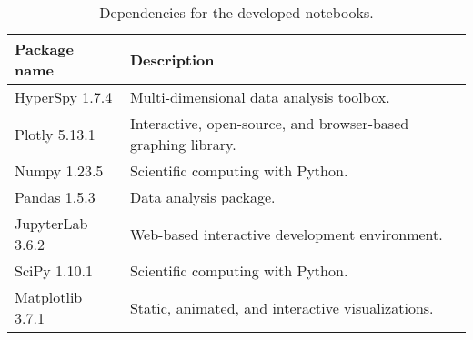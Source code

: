 \begin{table}[hbtp]
    \begin{center}
        \caption{
            Dependencies for the developed notebooks.
        }
        \renewcommand*{\arraystretch}{1.2}
        \label{tab:method:packages}
        \begin{tabular}{p{4cm}p{10.6cm}}
            \hline
            \textbf{Package name} & \textbf{Description}                                          \\
            \hline
            HyperSpy 1.7.4        & Multi-dimensional data analysis toolbox.                      \\
            Plotly 5.13.1         & Interactive, open-source, and browser-based graphing library. \\
            Numpy 1.23.5          & Scientific computing with Python.                             \\
            Pandas 1.5.3          & Data analysis package.                                        \\
            JupyterLab 3.6.2      & Web-based interactive development environment.                \\
            SciPy 1.10.1          & Scientific computing with Python.                             \\
            Matplotlib 3.7.1      & Static, animated, and interactive visualizations.             \\
            \hline
        \end{tabular}
    \end{center}
\end{table}